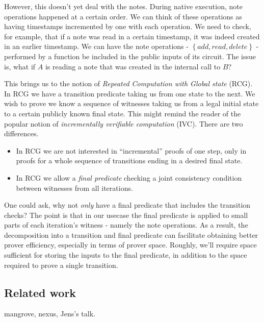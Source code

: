 \documentclass[11pt]{article} %
\newcommand{\set}[1]{\ensuremath{\left\{#1\right\}}\xspace}
\begin{document}
However, this doesn't yet deal with the notes. During native execution, note operations happened at a certain order.
We can think of these operations as having timestamps incremented by one with each operation.
We need to check, for example, that if a note was read in a certain timestamp, it was indeed created
in an earlier timestamp.
We can have the note operations - \set{add, read, delete} - performed by a function be included in the public inputs of its circuit.
The issue is, what if $A$ is reading a note that was created in the internal call to $B$?

This brings us to the notion of \emph{Repeated Computation with Global state} (RCG). In RCG we have a transition predicate taking us from one state to the next. We wish to prove we know a sequence of witnesses taking us from a legal initial state to a certain publicly known final state. This might remind the reader of the popular notion of \emph{incrementally verifiable computation} (IVC). There are two differences.

\begin{itemize}
 \item 
In RCG we are not interested in ``incremental'' proofs of one step, only in proofs for a whole
sequence of transitions ending in a desired final state.

\item In RCG we allow a \emph{final predicate} checking a joint consistency condition between witnesses from all iterations.

\end{itemize}
 One could ask, why not \emph{only} have a final predicate that includes the transition checks? 
The point is that in our usecase the final predicate is applied to small parts of each iteration's witness - namely the note operations. As a result, the decomposition into a transition and final predicate can facilitate obtaining better prover efficiency, especially in terms of prover space.
Roughly, we'll require space sufficient for storing the inputs to the final predicate, in addition to the space required to prove a single transition.

\subsection{Related work}
mangrove, nexus, Jens's talk.
\end{document}

